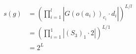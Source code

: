 \documentclass[preview]{standalone}
\begin{document}
\begin{align*}
s(g) &= \left(\prod_{i=1}^{l}\left|G(o(a_i))_{c_i}\cdot d_i\right|\right)^{L/l} \\   &= \left(\prod_{i=1}^{1}\left|\left(S_3\right)_{1}\cdot 2\right|\right)^{L/1} \\   &= 2^{L}
\end{align*}
\end{document}
